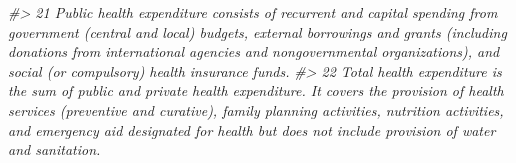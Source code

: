 \documentclass[
  xelatex, ja=standard]{bxjsbook}
\newenvironment{Shaded}{\begin{snugshade}}{\end{snugshade}}
\newcommand{\CommentTok}[1]{\textcolor[rgb]{0.56,0.35,0.01}{\textit{#1}}}
\theoremstyle{definition}
\theoremstyle{definition}
\theoremstyle{definition}
\theoremstyle{definition}
\theoremstyle{remark}
\begin{document}
\begin{Shaded}
\begin{Highlighting}[]
\CommentTok{\#\textgreater{} 21                                                                                                                                                                                                                                                                                                                                                                                                                                                                                                                                                                                                                                                                                                                                                                                                                                                                                                                                                                                                                                                                                                                                                          Public health expenditure consists of recurrent and capital spending from government (central and local) budgets, external borrowings and grants (including donations from international agencies and nongovernmental organizations), and social (or compulsory) health insurance funds.}
\CommentTok{\#\textgreater{} 22                                                                                                                                                                                                                                                                                                                                                                                                                                                                                                                                                                                                                                                                                                                                                                                                                                                                                                                                                                                                                                                                                                                                             Total health expenditure is the sum of public and private health expenditure. It covers the provision of health services (preventive and curative), family planning activities, nutrition activities, and emergency aid designated for health but does not include provision of water and sanitation.}

\end{Highlighting}
\end{Shaded}
\end{document}
